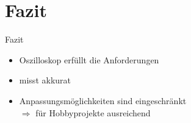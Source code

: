 \section{Fazit}
\begin{frame}{Fazit}
	\begin{itemize}
		\item Oszilloskop erfüllt die Anforderungen \vspace{0.5em}
		\item misst akkurat \vspace{0.5em}
		\item Anpassungsmöglichkeiten sind eingeschränkt \vspace{0.5em}
		\\ $\Rightarrow$ für Hobbyprojekte ausreichend
	\end{itemize}

\end{frame}

